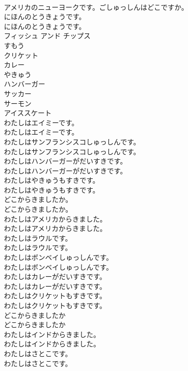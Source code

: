\documentclass[8pt]{extreport}
\begin{document}
\begin{CJK}{UTF8}{min}
\\	アメリカのニューヨークです。ごしゅっしんはどこですか。 
\\	にほんのとうきょうです。	
\\	にほんのとうきょうです。 
\\	フィッシュ アンド チップス
\\	すもう
\\	クリケット
\\	カレー
\\	やきゅう
\\	ハンバーガー
\\	サッカー
\\	サーモン
\\	アイススケート
\\	わたしはエイミーです。	
\\	わたしはエイミーです。 
\\	わたしはサンフランシスコしゅっしんです。	
\\	わたしはサンフランシスコしゅっしんです。 
\\	わたしはハンバーガーがだいすきです。	
\\	わたしはハンバーガーがだいすきです。 
\\	わたしはやきゅうもすきです。	
\\	わたしはやきゅうもすきです。 
\\	どこからきましたか。	
\\	どこからきましたか。 
\\	わたしはアメリカからきました。	
\\	わたしはアメリカからきました。 
\\	わたしはラウルです。	
\\	わたしはラウルです。 
\\	わたしはボンベイしゅっしんです。	
\\	わたしはボンベイしゅっしんです。 
\\	わたしはカレーがだいすきです。	
\\	わたしはカレーがだいすきです。 
\\	わたしはクリケットもすきです。	
\\	わたしはクリケットもすきです。 
\\	どこからきましたか	
\\	どこからきましたか 
\\	わたしはインドからきました。	
\\	わたしはインドからきました。 
\\	わたしはさとこです。	
\\	わたしはさとこです。 

\end{CJK}
\end{document}
